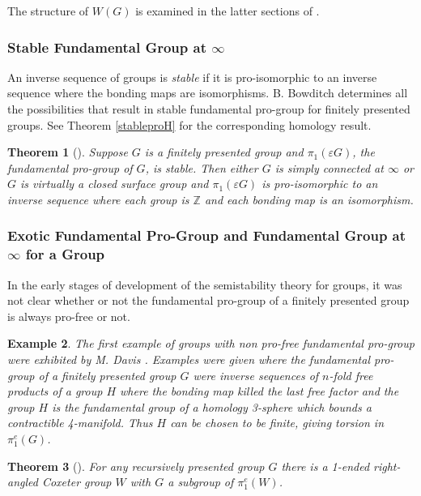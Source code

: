 \documentclass[12pt]{article}
\newtheorem{theorem}{Theorem}[subsection]
\newtheorem{example}[theorem]{Example}
\begin{document}
The structure of $W(G)$ is examined in the latter sections of \cite{BK19}. 


\subsubsection{Stable Fundamental Group at $\infty$} \label{StablePP1}
An inverse sequence of groups is {\it stable} if it is pro-isomorphic to an inverse sequence where the bonding maps are isomorphisms. B. Bowditch determines all the possibilities that result in stable fundamental pro-group for finitely presented groups. See Theorem \ref{stableproH} for the corresponding homology result.

\begin{theorem} [\cite{Bo04}] \label{stablepro} Suppose $G$ is a finitely presented group and $\pi_1(\varepsilon G)$, the fundamental pro-group of $G$, is stable. Then either $G$ is simply connected at $\infty$ or $G$ is virtually a closed surface group and $\pi_1(\varepsilon G)$ is pro-isomorphic to an inverse sequence where each group is $\mathbb Z$ and each bonding map is an isomorphism.
\end{theorem}


\subsubsection{Exotic Fundamental Pro-Group and Fundamental Group at $\infty$ for a Group}\label{WildPro} 

In the early stages of development of the semistability theory for groups, it was not clear whether or not the fundamental pro-group of a finitely presented group is always pro-free or not. 
\begin{example} \label{DavisEx} 
The first example of groups with non pro-free fundamental pro-group were exhibited by M. Davis  \cite{Davis83}. Examples were given where the fundamental pro-group of a finitely presented group $G$ were inverse sequences of $n$-fold free products of a group $H$ where the bonding map killed the last free factor and the group $H$ is the fundamental group of a homology 3-sphere which bounds a contractible 4-manifold. Thus $H$ can be chosen to be finite, giving torsion in $\pi_1^e(G)$. 
\end{example}

\begin{theorem} [\cite{ DM02}] \label{RecRA} For any recursively presented group $G$ there is a 1-ended right-angled Coxeter group $W$ with $G$ a subgroup of $\pi_1^e(W)$.
\end{theorem}
\end{document}
